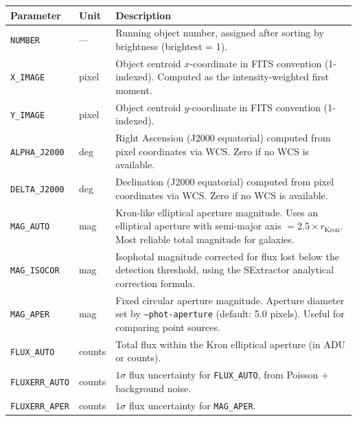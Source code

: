 \documentclass[11pt,fleqn]{book}
\begin{document}
\begin{center}
\begin{longtable}{L{3.2cm} C{1.8cm} L{7.5cm}}
\toprule
\textbf{Parameter} & \textbf{Unit} & \textbf{Description} \\
\midrule
\endhead

\texttt{NUMBER} & --- & Running object number, assigned after sorting by brightness (brightest = 1). \\
\midrule

\texttt{X\_IMAGE} & pixel & Object centroid $x$-coordinate in FITS convention (1-indexed). Computed as the intensity-weighted first moment. \\
\midrule

\texttt{Y\_IMAGE} & pixel & Object centroid $y$-coordinate in FITS convention (1-indexed). \\
\midrule

\texttt{ALPHA\_J2000} & deg & Right Ascension (J2000 equatorial) computed from pixel coordinates via WCS. Zero if no WCS is available. \\
\midrule

\texttt{DELTA\_J2000} & deg & Declination (J2000 equatorial) computed from pixel coordinates via WCS. Zero if no WCS is available. \\
\midrule

\texttt{MAG\_AUTO} & mag & Kron-like elliptical aperture magnitude. Uses an elliptical aperture with semi-major axis $= 2.5 \times r_{\text{Kron}}$. Most reliable total magnitude for galaxies. \\
\midrule

\texttt{MAG\_ISOCOR} & mag & Isophotal magnitude corrected for flux lost below the detection threshold, using the SExtractor analytical correction formula. \\
\midrule

\texttt{MAG\_APER} & mag & Fixed circular aperture magnitude. Aperture diameter set by \texttt{--phot-aperture} (default: 5.0 pixels). Useful for comparing point sources. \\
\midrule

\texttt{FLUX\_AUTO} & counts & Total flux within the Kron elliptical aperture (in ADU or counts). \\
\midrule

\texttt{FLUXERR\_AUTO} & counts & $1\sigma$ flux uncertainty for \texttt{FLUX\_AUTO}, from Poisson + background noise. \\
\midrule

\texttt{FLUXERR\_APER} & counts & $1\sigma$ flux uncertainty for \texttt{MAG\_APER}. \\
\midrule


\end{longtable}
\end{center}
\end{document}
